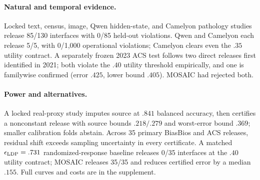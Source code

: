 \paragraph{Natural and temporal evidence.}
Locked text, census, image, Qwen hidden-state, and Camelyon pathology studies
release 85/130 interfaces with 0/85 held-out violations. Qwen and Camelyon each
release 5/5, with 0/1,000 operational violations; Camelyon clears even the
$.35$ utility contract. A separately frozen 2023 ACS test follows two direct
releases first identified in 2021; both violate the $.40$ utility threshold
empirically, and one is familywise confirmed (error $.425$, lower bound
$.405$). MOSAIC had rejected both.

\paragraph{Power and alternatives.}
A locked real-proxy study imputes source at $.841$ balanced accuracy, then
certifies a nonconstant release with source bounds $.218/.279$ and worst-error
bound $.369$; smaller calibration folds abstain. Across 35 primary BiasBios and
ACS releases, residual shift exceeds sampling uncertainty in every certificate.
A matched $\epsilon_{\rm LDP}=.731$ randomized-response baseline releases 0/35
interfaces at the $.40$ utility contract; MOSAIC releases 35/35 and reduces
certified error by a median $.155$. Full curves and costs are in the supplement.
